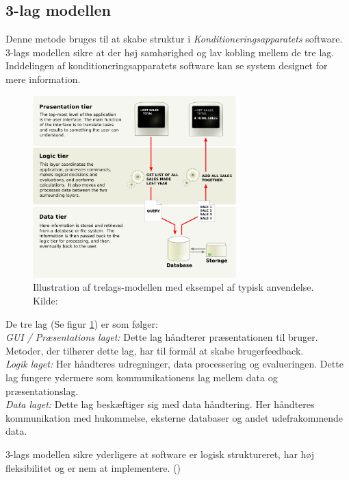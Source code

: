 \subsection{3-lag modellen}
Denne metode bruges til at skabe struktur i \textit{Konditioneringsapparatets} software. 3-lags modellen sikre at der høj samhørighed og lav kobling mellem de tre lag. Inddelingen af konditioneringsapparatets software kan se system designet  for mere information. 
\begin{figure}[H]
	\centering
\includegraphics[width = 0.7\textwidth]{billeder/trelagsmodel.png}
\caption{Illustration af trelags-modellen med eksempel af typisk anvendelse. Kilde: \cite{Billede:2}}\label{fig:3lagsmodel}
\end{figure}

De tre lag (Se figur \ref{fig:3lagsmodel}) er som følger: \\
\textit{GUI / Præsentations laget:} Dette lag håndterer præsentationen til bruger. Metoder, der tilhører dette lag, har til formål at skabe brugerfeedback. \\
\textit{Logik laget: } Her håndteres udregninger, data processering og evalueringen. Dette lag fungere ydermere som kommunikationens lag mellem data og præsentationslag. 
\\ \textit{Data laget: } Dette lag beskæftiger sig med data håndtering. Her håndteres kommunikation med hukommelse, eksterne databaser og andet udefrakommende data.

3-lags modellen sikre yderligere at software er logisk struktureret, har høj fleksibilitet og er nem at implementere. (\cite{RefWorks:31})
